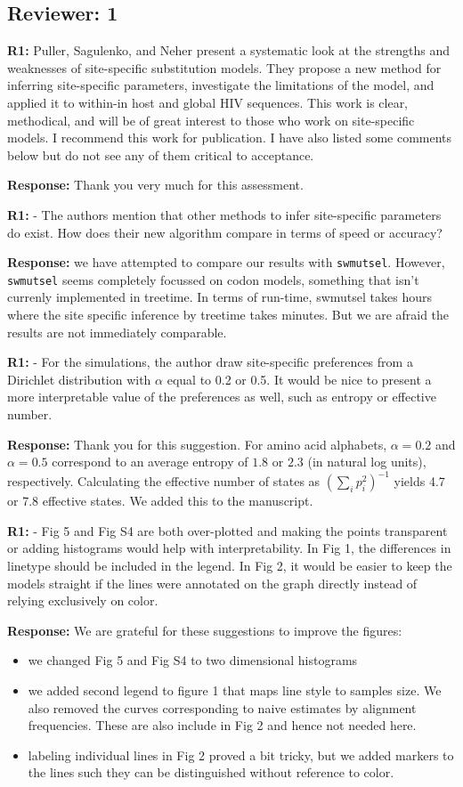 \documentclass[aps,rmp,onecolumn]{revtex4-1}
\newcommand{\refa}[1]{\textbf{R1:} #1}
\newcommand{\response}[1]{{\color{black}\textbf{Response:} #1}}
\begin{document}
\subsection*{Reviewer: 1}

\refa{Puller, Sagulenko, and Neher present a systematic look at the strengths and weaknesses of site-specific substitution models. They propose a new method for inferring site-specific parameters, investigate the limitations of the model, and applied it to within-in host and global HIV sequences. This work is clear, methodical, and will be of great interest to those who work on site-specific models. I recommend this work for publication. I have also listed some comments below but do not see any of them critical to acceptance.}

\response{Thank you very much for this assessment.}

\refa{- The authors mention that other methods to infer site-specific parameters do exist. How does their new algorithm compare in terms of speed or accuracy?}

\response{we have attempted to compare our results with \texttt{swmutsel}.
However, \texttt{swmutsel} seems completely focussed on codon models, something that isn't currenly implemented in treetime. In terms of run-time, swmutsel takes hours where the site specific inference by treetime takes minutes.
But we are afraid the results are not immediately comparable. }


\refa{- For the simulations, the author draw site-specific preferences from a Dirichlet distribution with $\alpha$ equal to 0.2 or 0.5. It would be nice to present a more interpretable value of the preferences as well, such as entropy or effective number.}

\response{
Thank you for this suggestion.
For amino acid alphabets, $\alpha=0.2$ and $\alpha=0.5$ correspond to an average entropy of $1.8$ or $2.3$ (in natural log units), respectively.
Calculating the effective number of states as $\left(\sum_i p_i^2\right)^{-1}$ yields 4.7 or 7.8 effective states.
We added this to the manuscript.}


\refa{- Fig 5 and Fig S4 are both over-plotted and making the points transparent or adding histograms would help with interpretability. In Fig 1, the differences in linetype should be included in the legend. In Fig 2, it would be easier to keep the models straight if the lines were annotated on the graph directly instead of relying exclusively on color.}

\response{
We are grateful for these suggestions to improve the figures:
\begin{itemize}
    \item we changed Fig 5 and Fig S4 to two dimensional histograms
    \item we added second legend to figure 1 that maps line style to samples size. We also removed the curves corresponding to naive estimates by alignment frequencies. These are also include in Fig 2 and hence not needed here.
    \item labeling individual lines in Fig 2 proved a bit tricky, but we added markers to the lines such they can be distinguished without reference to color.
\end{itemize}
}
\end{document}
